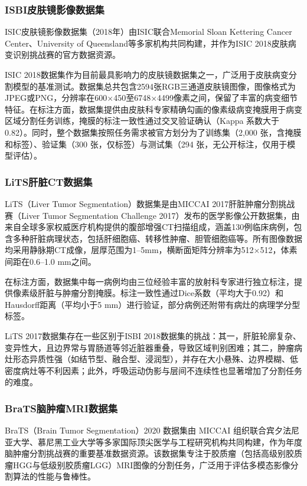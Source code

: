 \subsubsection{ISBI皮肤镜影像数据集}

ISIC皮肤镜影像数据集（2018年）由ISIC联合Memorial Sloan Kettering Cancer Center、University of Queensland等多家机构共同构建，并作为ISIC 2018皮肤病变识别挑战赛的官方数据资源\cite{codella2019skinlesionanalysismelanoma}。

ISIC 2018数据集作为目前最具影响力的皮肤镜数据集之一，广泛用于皮肤病变分割模型的基准测试。数据集总共包含2594张RGB三通道皮肤镜图像，图像格式为JPEG或PNG，分辨率在600×450至6748×4499像素之间，保留了丰富的病变细节特征。在标注方面，数据集提供由皮肤科专家精确勾画的像素级病变掩膜用于病变区域分割任务训练，掩膜的标注一致性通过交叉验证确认（Kappa 系数大于 0.82）。同时，整个数据集按照任务需求被官方划分为了训练集（2,000 张，含掩膜和标签）、验证集（300 张，仅标签）与测试集（294 张，无公开标注，仅用于模型评估）。

\subsubsection{LiTS肝脏CT数据集}

LiTS（Liver Tumor Segmentation）数据集是由MICCAI 2017肝脏肿瘤分割挑战赛（Liver Tumor Segmentation Challenge 2017）发布的医学影像公开数据集，由来自全球多家权威医疗机构提供的腹部增强CT扫描组成，涵盖130例临床病例，包含多种肝脏病理状态，包括肝细胞癌、转移性肿瘤、胆管细胞癌等\cite{Bilic_2023}。所有图像数据均采用静脉期CT成像，层厚范围为1–5mm，横断面矩阵分辨率为512×512，体素间距在0.6–1.0 mm之间。

在标注方面，数据集中每一病例均由三位经验丰富的放射科专家进行独立标注，提供像素级肝脏与肿瘤分割掩膜。标注一致性通过Dice系数（平均大于0.92）和Hausdorff距离（平均小于5 mm）进行验证，部分病例还附带有病灶的病理学分型标签。

LiTS 2017数据集存在一些区别于ISBI 2018数据集的挑战：其一，肝脏轮廓复杂、变异性大，且边界常与胃肠道等邻近脏器重叠，导致区域判别困难；其二，肿瘤病灶形态异质性强（如结节型、融合型、浸润型），并存在大小悬殊、边界模糊、低密度病灶等不利因素；此外，呼吸运动伪影与层间不连续性也显著增加了分割任务的难度。

\subsubsection{BraTS脑肿瘤MRI数据集}

BraTS（Brain Tumor Segmentation）2020 数据集由 MICCAI 组织联合宾夕法尼亚大学、慕尼黑工业大学等多家国际顶尖医学与工程研究机构共同构建，作为年度脑肿瘤分割挑战赛的重要基准数据资源\cite{menze2015}。该数据集专注于胶质瘤（包括高级别胶质瘤HGG与低级别胶质瘤LGG）MRI图像的分割任务，广泛用于评估多模态影像分割算法的性能与鲁棒性。

